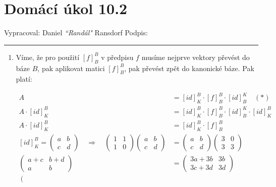 \documentclass[12pt]{article}
\begin{document}
\section*{Domácí úkol 10.2}

Vypracoval: Daniel \textit{``Randál"} Ransdorf \hfill Podpis: \rule{4cm}{0.4pt}

\begin{enumerate}
  
  \item Víme, že pro použití $[f]^B_B$ v předpisu $f$ musíme nejprve vektory
    převést do báze $B$, pak aplikovat matici $[f]^B_B$, pak převést zpět do kanonické báze.
    Pak platí:

    \begin{align*}
      A &= [id]^B_K \cdot [f]^B_B \cdot [id]^K_B \quad (*) \\
      A \cdot [id]^B_K  &= [id]^B_K \cdot [f]^B_B \cdot [id]^K_B \cdot [id]^B_K  \\
      A \cdot [id]^B_K  &= [id]^B_K \cdot [f]^B_B \\
      [id]^B_K = \left(\begin{array}{cc}
        a&b\\c&d
      \end{array}\right) \quad \Longrightarrow \quad
      \left(\begin{array}{cc}
        1&1\\1&0
      \end{array}\right) \left(\begin{array}{cc}
        a&b\\c&d
      \end{array}\right) &= \left(\begin{array}{cc}
        a&b\\c&d
      \end{array}\right) \left(\begin{array}{cc}
        3&0\\3&3
      \end{array}\right) \\
      \left(\begin{array}{cc}
        a+c & b+d \\
        a & b
      \end{array}\right) &= \left(\begin{array}{cc}
        3a+3b & 3b \\
        3c+3d & 3d
      \end{array}\right) \\
      \left(\begin{array}{cc}

\end{array}
\end{align*}
\end{enumerate}
\end{document}
